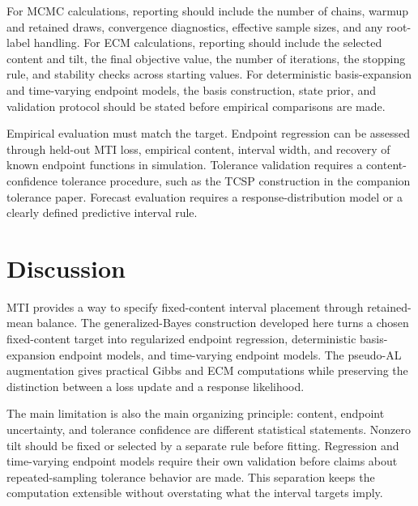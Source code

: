 \documentclass[11pt]{article}
\numberwithin{equation}{section}
\begin{document}
For MCMC calculations, reporting should include the number of chains, warmup and
retained draws, convergence diagnostics, effective sample sizes, and any
root-label handling. For ECM calculations, reporting should include the
selected content and tilt, the final objective value, the number of iterations,
the stopping rule, and stability checks across starting values. For deterministic
basis-expansion and time-varying endpoint models, the basis construction, state prior,
and validation protocol should be stated before empirical comparisons are made.

Empirical evaluation must match the target. Endpoint regression can be assessed
through held-out MTI loss, empirical content, interval width, and recovery of
known endpoint functions in simulation. Tolerance validation requires a
content-confidence tolerance procedure, such as the TCSP construction in the companion
tolerance paper. Forecast evaluation requires a response-distribution model or a
clearly defined predictive interval rule.

\section{Discussion}
\label{sec:discussion}

MTI provides a way to specify fixed-content interval placement through
retained-mean balance. The generalized-Bayes construction developed here turns a
chosen fixed-content target into regularized endpoint regression, deterministic
basis-expansion endpoint models, and time-varying endpoint models. The pseudo-AL augmentation
gives practical Gibbs and ECM computations while preserving the distinction
between a loss update and a response likelihood.

The main limitation is also the main organizing principle: content, endpoint
uncertainty, and tolerance confidence are different statistical statements.
Nonzero tilt should be fixed or selected by a separate rule before fitting.
Regression and time-varying endpoint models require their own validation before
claims about repeated-sampling tolerance behavior are made. This separation
keeps the computation extensible without overstating what the interval targets
imply.

\clearpage


\end{document}

